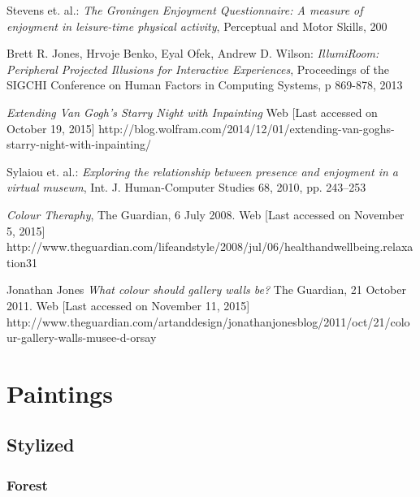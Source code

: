 \documentclass[a4paper]{article}
\begin{document}
\begin{thebibliography}{99}
 Stevens et. al.:
\emph{The Groningen Enjoyment Questionnaire: A measure of enjoyment in leisure-time physical activity},
Perceptual and Motor Skills, 200

 Brett R. Jones, Hrvoje Benko, Eyal Ofek, Andrew D. Wilson:
\emph{IllumiRoom: Peripheral Projected Illusions for
Interactive Experiences},
Proceedings of the SIGCHI Conference on Human Factors in Computing Systems, p 869-878, 2013

\emph{Extending Van Gogh’s \emph{Starry Night} with Inpainting}
Web [Last accessed on October 19, 2015]
http://blog.wolfram.com/2014/12/01/extending-van-goghs-starry-night-with-inpainting/

 Sylaiou et. al.:
\emph{Exploring the relationship between presence and enjoyment in a virtual museum},
Int. J. Human-Computer Studies 68, 2010, pp. 243--253

\emph{Colour Theraphy}, 
The Guardian, 6 July 2008.
Web [Last accessed on November 5, 2015]
http://www.theguardian.com/lifeandstyle/2008/jul/06/healthandwellbeing.relaxation31

 Jonathan Jones
\emph{What colour should gallery walls be?}
The Guardian, 21 October 2011.
Web [Last accessed on November 11, 2015]
http://www.theguardian.com/artanddesign/jonathanjonesblog/2011/oct/21/colour-gallery-walls-musee-d-orsay


\end{thebibliography}













\appendix
\section{Paintings} \label{sec:paintings}



\subsection{Stylized}
\subsubsection{Forest}
\end{document}
